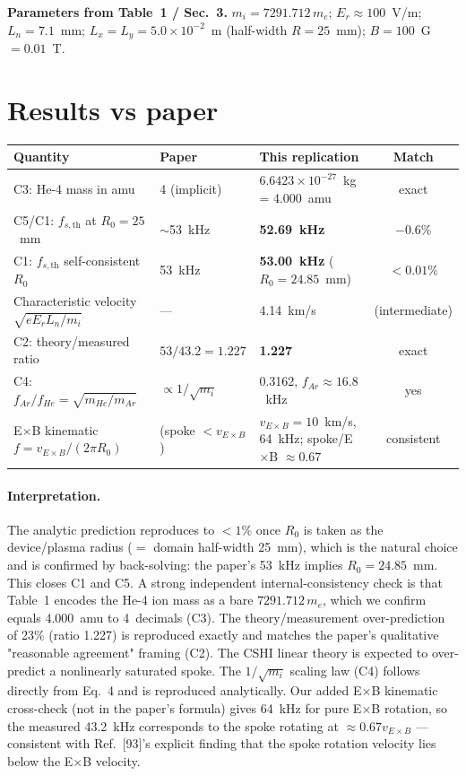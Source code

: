\documentclass[11pt]{article}
\begin{document}
\textbf{Parameters from Table~1 / Sec.~3.} $m_i = 7291.712\,m_e$;
$E_r \approx 100$~V/m; $L_n = 7.1$~mm; $L_x = L_y = 5.0 \times 10^{-2}$~m
(half-width $R = 25$~mm); $B = 100$~G $= 0.01$~T.

\section{Results vs paper}
\begin{table}[h]
\centering\small
\begin{tabular}{@{}lllc@{}}
\toprule
Quantity & Paper & This replication & Match \\
\midrule
C3: He-4 mass in amu & 4 (implicit) & $6.6423\times10^{-27}$~kg = 4.000~amu & exact \\
C5/C1: $f_{s,\text{th}}$ at $R_0=25$~mm & $\sim$53~kHz & \textbf{52.69~kHz} & $-0.6\%$ \\
C1: $f_{s,\text{th}}$ self-consistent $R_0$ & 53~kHz & \textbf{53.00~kHz} ($R_0=24.85$~mm) & $<0.01\%$ \\
Characteristic velocity $\sqrt{eE_rL_n/m_i}$ & --- & 4.14~km/s & (intermediate) \\
C2: theory/measured ratio & $53/43.2 = 1.227$ & \textbf{1.227} & exact \\
C4: $f_{Ar}/f_{He} = \sqrt{m_{He}/m_{Ar}}$ & $\propto 1/\sqrt{m_i}$ & 0.3162, $f_{Ar}\approx 16.8$~kHz & yes \\
E$\times$B kinematic $f = v_{E\times B}/(2\pi R_0)$ & (spoke $< v_{E\times B}$) & $v_{E\times B}=10$~km/s, 64~kHz; spoke/E$\times$B $\approx 0.67$ & consistent \\
\bottomrule
\end{tabular}
\end{table}

\paragraph{Interpretation.}
The analytic prediction reproduces to $<1\%$ once $R_0$ is taken as the
device/plasma radius ($=$ domain half-width 25~mm), which is the natural
choice and is confirmed by back-solving: the paper's 53~kHz implies
$R_0 = 24.85$~mm. This closes C1 and C5. A strong independent
internal-consistency check is that Table~1 encodes the He-4 ion mass as a
bare $7291.712\,m_e$, which we confirm equals 4.000~amu to 4~decimals (C3).
The theory/measurement over-prediction of 23\% (ratio 1.227) is reproduced
exactly and matches the paper's qualitative "reasonable agreement" framing
(C2). The CSHI linear theory is expected to over-predict a nonlinearly
saturated spoke. The $1/\sqrt{m_i}$ scaling law (C4) follows directly from
Eq.~4 and is reproduced analytically. Our added E$\times$B kinematic
cross-check (not in the paper's formula) gives 64~kHz for pure E$\times$B
rotation, so the measured 43.2~kHz corresponds to the spoke rotating at
$\approx 0.67 v_{E\times B}$ --- consistent with Ref.~[93]'s explicit
finding that the spoke rotation velocity lies below the E$\times$B velocity.
\end{document}
